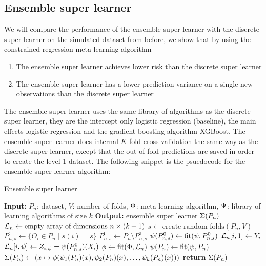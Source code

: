 \documentclass[./main.tex]{subfiles}
\begin{document}
\subsection{Ensemble super learner}
We will compare the performance of the ensemble super learner with the discrete super learner on the simulated dataset from before, we show that by using the constrained regression meta learning algorithm
\begin{enumerate}
    \item The ensemble super learner achieves lower risk than the discrete super learner
    \item The ensemble super learner has a lower prediction variance on a single new observations than the discrete super learner
\end{enumerate}

The ensemble super learner uses the same library of algorithms as the discrete super learner, they are the intercept only logistic regression (baseline), the main effects logistic regression and the gradient boosting algorithm XGBoost. The ensemble super learner does internal $ K $-fold cross-validation the same way as the discrete super learner, except that the out-of-fold predictions are saved in order to create the level 1 dataset. The following snippet is the psuedocode for the ensemble super learner algorithm:
\begin{algorithm}[H]
\caption{Ensemble super learner}
\begin{algorithmic}[1]
\State \textbf{Input:} $P_n$: dataset, $V$: number of folds, $ \Phi $: meta learning algorithm, $ \Psi $: library of learning algorithms of size $ k $
\State \textbf{Output:} ensemble super learner $ \Sigma(P_n) $
\State $\mathcal{L}_n \gets \text{empty array of dimensions } n \times (k+1)$  
\State $s \gets \text{create random folds}(P_n, V)$ 
    \State $P_{n, s}^{1} \gets \{O_i \in P_n \mid s(i) = s\} $
    \State $P_{n, s}^{0} \gets P_n \setminus P_{n,s}^{1} $
    \For{$\la \in \lib$}
        \State $ \psi(P_{n,s}^{0}) \gets \text{fit}(\psi, P_{n, s}^{0})$
            \State $ \mathcal{L}_n[i, 1] \gets Y_i $ 
            \State $ \mathcal{L}_n[i, \psi] \gets Z_{i, \psi} = \psi(P_{n,s}^{0})(X_i) $ 
        \EndFor
    \EndFor
\EndFor
\State $ \phi \gets \text{fit}(\Phi, \mathcal{L}_n) $ 
\For{$\la \in \lib$}
    \State $ \psi(P_{n}) \gets \text{fit}(\psi, P_{n})$ 
\EndFor
\State $ \Sigma(P_n) \gets (x \mapsto \phi(\psi_1(P_n)(x), \psi_2(P_n)(x), \dots , \psi_{k}(P_n)(x))) $ 
\State \textbf{return} $ \Sigma(P_n) $
\end{algorithmic}
\end{algorithm}
\end{document}

